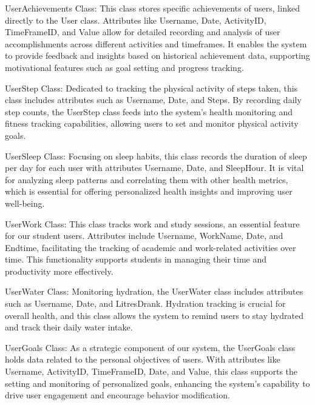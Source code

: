 \documentclass[12pt]{article}
\begin{document}
UserAchievements Class: This class stores specific achievements of users, linked directly to the User class. Attributes like Username, Date, ActivityID, TimeFrameID, and Value allow for detailed recording and analysis of user accomplishments across different activities and timeframes. It enables the system to provide feedback and insights based on historical achievement data, supporting motivational features such as goal setting and progress tracking.\par

UserStep Class: Dedicated to tracking the physical activity of steps taken, this class includes attributes such as Username, Date, and Steps. By recording daily step counts, the UserStep class feeds into the system’s health monitoring and fitness tracking capabilities, allowing users to set and monitor physical activity goals.\par

UserSleep Class: Focusing on sleep habits, this class records the duration of sleep per day for each user with attributes Username, Date, and SleepHour. It is vital for analyzing sleep patterns and correlating them with other health metrics, which is essential for offering personalized health insights and improving user well-being.\par

UserWork Class: This class tracks work and study sessions, an essential feature for our student users. Attributes include Username, WorkName, Date, and Endtime, facilitating the tracking of academic and work-related activities over time. This functionality supports students in managing their time and productivity more effectively.\par

UserWater Class: Monitoring hydration, the UserWater class includes attributes such as Username, Date, and LitresDrank. Hydration tracking is crucial for overall health, and this class allows the system to remind users to stay hydrated and track their daily water intake.\par

UserGoals Class: As a strategic component of our system, the UserGoals class holds data related to the personal objectives of users. With attributes like Username, ActivityID, TimeFrameID, Date, and Value, this class supports the setting and monitoring of personalized goals, enhancing the system's capability to drive user engagement and encourage behavior modification.\par
\end{document}
